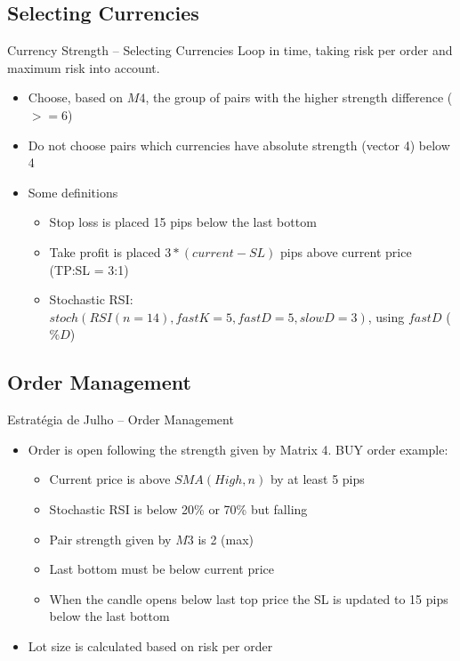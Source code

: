 \documentclass[12pt,portuguese]{beamer}
\begin{document}
\subsection{Selecting Currencies}
\begin{frame}{Currency Strength -- Selecting Currencies}
	Loop in time, taking risk per order and maximum risk into account.
\begin{itemize}
	\item Choose, based on $M4$, the group of pairs with the higher strength difference ($>= 6$)
	\item Do not choose pairs which currencies have absolute strength (vector 4) below 4
	\item Some definitions
		\begin{itemize}
			\item Stop loss is placed 15 pips below the last bottom
			\item Take profit is placed $3*(current-SL)$ pips above current price (TP:SL = 3:1)
			\item Stochastic RSI: $stoch(RSI(n=14), fastK=5, fastD=5, slowD=3)$, using $fastD$ ($\%D$)
		\end{itemize}
\end{itemize}
\end{frame}

\subsection{Order Management}
\begin{frame}{Estratégia de Julho -- Order Management}
\begin{itemize}
	\item Order is open following the strength given by Matrix 4. BUY order example:
		\begin{itemize}
			\item Current price is above $SMA(High, n)$ by at least 5 pips
			\item Stochastic RSI is below 20\% or 70\% but falling
			\item Pair strength given by $M3$ is 2 (max)
			\item Last bottom must be below current price
			\item When the candle opens below last top price the SL is updated to 15 pips below the last bottom
		\end{itemize}
	\item Lot size is calculated based on risk per order
\end{itemize}
\end{frame}
\end{document}

